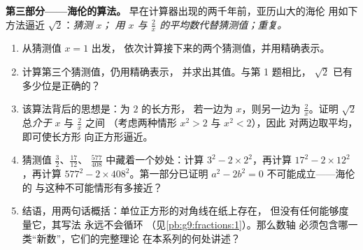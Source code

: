 \begin{problem}
\medskip
\noindent\textbf{第三部分——海伦的算法。}
早在计算器出现的两千年前，亚历山大的海伦
用如下方法逼近 $\sqrt2$：\emph{猜测 $x$；
用 $x$ 与 $\frac2x$ 的平均数代替猜测值；重复。}
\begin{enumerate}[resume]
  \item 从猜测值 $x = 1$ 出发，
        依次计算接下来的两个猜测值，并用精确表示。
  \item 计算第三个猜测值，仍用精确表示，
        并求出其值。与第 1 题相比，
        $\sqrt2$ 已有多少位是正确的？
  \item 该算法背后的思想是：为 $2$ 的长方形，
        若一边为 $x$，则另一边为 $\frac2x$。证明
        $\sqrt2$ 总\emph{介于} $x$ 与 $\frac2x$ 之间
        （考虑两种情形 $x^2 > 2$ 与 $x^2 < 2$），因此
        对两边取平均，即可使长方形
        向正方形逼近。
  \item 猜测值 $\frac32$、$\frac{17}{12}$、
        $\frac{577}{408}$ 中藏着一个妙处：计算 $3^2 - 2 \times
        2^2$，再计算 $17^2 - 2 \times 12^2$，再计算
        $577^2 - 2 \times 408^2$。第一部分已证明
        $a^2 - 2b^2 = 0$ 不可能成立——海伦的
        与这种不可能情形有多接近？
  \item 结语，用两句话概括：单位正方形的对角线在纸上存在，
        但没有任何能够度量它，其写法
        永远不会循环
        （见\cref{pb:g9:fractions:1}）。那么数轴
        必须包含哪一类“新数”，它们的完整理论
        在本系列的何处讲述？
\end{enumerate}
\end{problem}
